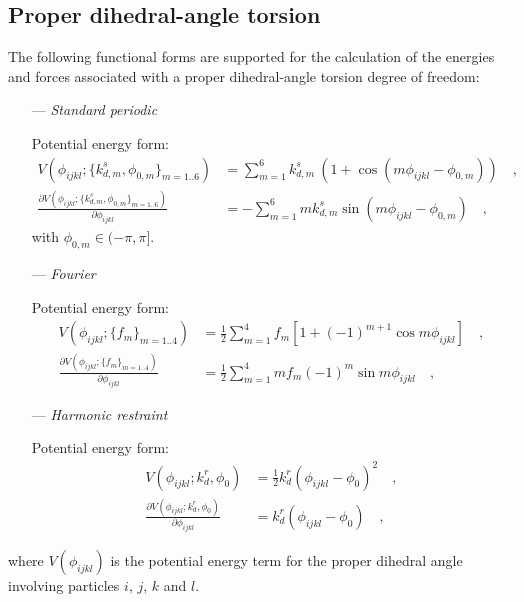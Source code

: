 \documentclass[10pt,a4paper,openany]{memoir}
\numberwithin{equation}{section}
\begin{document}
\subsection{Proper dihedral-angle torsion}
\label{sec:proper-terms}

The following functional forms are supported for the calculation of
the energies and forces associated with a proper dihedral-angle
torsion degree of freedom:\cite{GROMOS-doc,GROMACS-doc}

\begin{itemize}
\item [---] \textit{Standard periodic}
  \par
  Potential energy form:
  \begin{align}
    \label{eq:proper-standard-energy}
    V(\phi_{ijkl} ; \{k_{d,m}^s, \phi_{0,m}\}_{m=1..6}) & = \sum_{m=1}^{6} k_{d,m}^s\ (1 + \cos{( m \phi_{ijkl} - \phi_{0,m})})\quad , \\ \nonumber
    \frac{\partial V(\phi_{ijkl} ; \{k_{d,m}^s, \phi_{0,m}\}_{m=1..6})}{\partial \phi_{ijkl}} & = -\sum_{m=1}^{6} m k_{d,m}^s \sin{(m \phi_{ijkl} - \phi_{0,m})}\quad ,
  \end{align}
  with $\phi_{0,m} \in (-\pi, \pi]$.
  
\item [---]\textit{Fourier}
  \par
  Potential energy form:
   \begin{align}
    \label{eq:proper-fourier-energy}
     V(\phi_{ijkl} ; \{f_m\}_{m=1..4}) & = \frac{1}{2} \sum_{m=1}^{4} f_m \left[1 + (-1)^{m+1}\cos m\phi_{ijkl}\right] \quad , \\ \nonumber
     \frac{\partial V(\phi_{ijkl} ; \{f_m\}_{m=1..4})}{\partial \phi_{ijkl}} & = \frac{1}{2} \sum_{m=1}^{4} m f_m (-1)^{m}\sin m\phi_{ijkl} \quad ,
   \end{align}
   
\item [---]\textit{Harmonic restraint}
  \par
  Potential energy form:
  \begin{align}
  \label{eq:proper-restraint-energy}
  V(\phi_{ijkl}; k_d^r, \phi_0) & = \frac{1}{2} k_d^r (\phi_{ijkl} - \phi_0)^2 \quad , \\ \nonumber
  \frac{\partial V(\phi_{ijkl}; k_d^r, \phi_0)}{\partial \phi_{ijkl}} & = k_d^r (\phi_{ijkl} - \phi_0) \quad , 
\end{align}
\end{itemize}
where $V(\phi_{ijkl})$ is the potential energy term for the proper dihedral angle involving particles $i$, $j$, $k$ and $l$.
\end{document}

